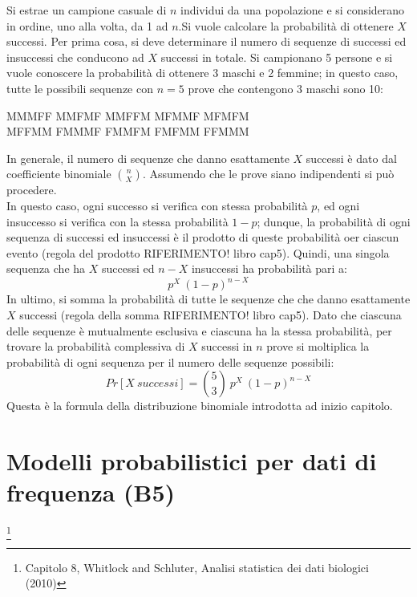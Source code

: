 \documentclass[drafts, 10pt]{book}
\newcounter{example}[section]
\begin{document}
\begin{example}
    Si estrae un campione casuale di $n$ individui da una popolazione e si considerano in ordine, uno alla volta, da 1 ad $n$.Si vuole calcolare la probabilità di ottenere $X$ successi. Per prima cosa, si deve determinare il numero di sequenze di successi ed insuccessi che conducono ad $X$ successi in totale.
    Si campionano 5 persone e si vuole conoscere la probabilità di ottenere 3 maschi e 2 femmine; in questo caso, tutte le possibili sequenze con $n = 5$ prove che contengono 3 maschi sono 10:

    \begin{center}
    MMMFF MMFMF MMFFM MFMMF MFMFM
    \\
    MFFMM FMMMF FMMFM FMFMM FFMMM
    \end{center}
    In generale, il numero di sequenze che danno esattamente $X$ successi è dato dal coefficiente binomiale $\binom{n}{X}$.
    Assumendo che le prove siano indipendenti si può procedere.
    \\
    In questo caso, ogni successo si verifica con stessa probabilità $p$, ed ogni insuccesso si verifica con la stessa probabilità $1-p$; dunque, la probabilità di ogni sequenza di successi ed insuccessi è il prodotto di queste probabilità oer ciascun evento (regola del prodotto RIFERIMENTO! libro cap5). Quindi, una singola sequenza che ha $X$ successi ed $n-X$ insuccessi ha probabilità pari a:
    \begin{equation}
    p^X \ (1-p)^{n-X}
    \end{equation}
    In ultimo, si somma la probabilità di tutte le sequenze che che danno esattamente $X$ successi (regola della somma RIFERIMENTO! libro cap5). Dato che ciascuna delle sequenze è mutualmente esclusiva e ciascuna ha la stessa probabilità, per trovare la probabilità complessiva di $X$ successi in $n$ prove si moltiplica la probabilità di ogni sequenza per il numero delle sequenze possibili:
    \begin{equation}
    Pr[X \ successi] = \binom{5}{3}\ p^X \ (1-p)^{n-X}
    \end{equation}
    Questa è la formula della distribuzione binomiale introdotta ad inizio capitolo.
\end{example}

\chapter{Modelli probabilistici per dati di frequenza (B5)}\footnote{Capitolo 8, Whitlock and Schluter, Analisi statistica dei dati biologici (2010)}
\end{document}
